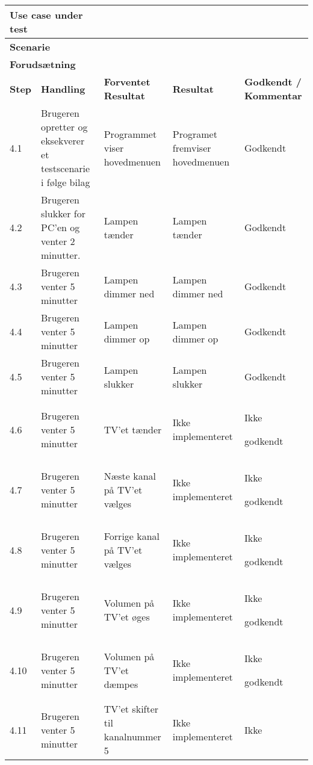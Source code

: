\begin{longtable}{| l | >{\raggedright}X | >{\raggedright}X | >{\raggedright}X | >{\raggedright\arraybackslash}p{2.3cm} |} \hline
\multicolumn{2}{|l|}{\textbf{Use case under test}} & \multicolumn{3}{l|}{UC4: "Afvikl Scenarie"} \\ \hline
	\multicolumn{2}{|l|}{\textbf{Scenarie}} & \multicolumn{3}{l|}{Hovedscenarie} \\ \hline
	\multicolumn{2}{|l|}{\textbf{Forudsætning}} & \multicolumn{3}{p{10.2cm}|}{Systemet er operationelt.\hfill} \\ \hline
	\textbf{Step} & \textbf{Handling} & \textbf{Forventet Resultat} & \textbf{Resultat} & \textbf{Godkendt / Kommentar} \\ \hline
	4.1 & Brugeren opretter og eksekverer et testscenarie i følge bilag \cite{lib:Testscenarie} 
	& Programmet viser hovedmenuen & Programet fremviser hovedmenuen & Godkendt \\ \hline
	4.2  & Brugeren slukker for PC'en og venter 2 minutter. & Lampen tænder & Lampen tænder & Godkendt \\ \hline
	4.3  & Brugeren venter 5 minutter & Lampen dimmer ned & Lampen dimmer ned & Godkendt \\ \hline
	4.4  & Brugeren venter 5 minutter & Lampen dimmer op & Lampen dimmer op & Godkendt \\ \hline
	4.5  & Brugeren venter 5 minutter & Lampen slukker &Lampen slukker & Godkendt \\ \hline
	4.6  & Brugeren venter 5 minutter & TV'et tænder & Ikke implementeret & Ikke 
	
	godkendt \\ \hline
	4.7  & Brugeren venter 5 minutter & Næste kanal på TV'et vælges & Ikke implementeret & Ikke 
	
	godkendt \\ \hline
	4.8  & Brugeren venter 5 minutter & Forrige kanal på TV'et vælges & Ikke implementeret & Ikke 
	
	godkendt \\ \hline
	4.9  & Brugeren venter 5 minutter & Volumen på TV'et øges & Ikke implementeret & Ikke 
	
	godkendt \\ \hline
	4.10 & Brugeren venter 5 minutter & Volumen på TV'et dæmpes & Ikke implementeret & Ikke 
	
	godkendt \\ \hline
	4.11 & Brugeren venter 5 minutter & TV'et skifter til kanalnummer 5 & Ikke implementeret & Ikke 
	

\end{longtable}
